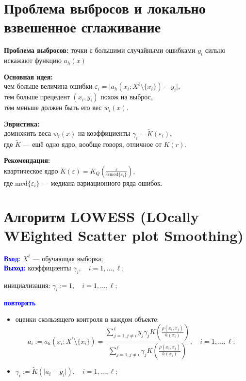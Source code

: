 \section*{Проблема выбросов и локально взвешенное сглаживание}

\textbf{Проблема выбросов:} точки с большими случайными ошибками \(y_i\) сильно искажают функцию \(a_h(x)\)

\vspace{1em}
\textbf{Основная идея:} \\
чем больше величина ошибки \(\varepsilon_i = \lvert a_h(x_i; X^\ell \setminus \{x_i\}) - y_i \rvert\), \\
тем больше прецедент \((x_i, y_i)\) похож на выброс, \\
тем меньше должен быть его вес \(w_i(x)\).

\vspace{1em}
\textbf{Эвристика:} \\
домножить веса \(w_i(x)\) на коэффициенты \(\gamma_i = \tilde{K}(\varepsilon_i)\), \\
где \(\tilde{K}\) — ещё одно ядро, вообще говоря, отличное от \(K(r)\).

\vspace{1em}
\textbf{Рекомендация:} \\
квартическое ядро \(\tilde{K}(\varepsilon) = K_Q \left( \frac{\varepsilon}{6 \, \mathrm{med}\{\varepsilon_i\}} \right)\), \\
где \(\mathrm{med}\{\varepsilon_i\}\) — медиана вариационного ряда ошибок.

\section*{Алгоритм LOWESS (LOcally WEighted Scatter plot Smoothing)}

\vspace{1em}
\textcolor{blue}{\textbf{Вход:}} \(X^\ell\) — обучающая выборка; \\
\textcolor{blue}{\textbf{Выход:}} коэффициенты \(\gamma_i, \quad i = 1, \ldots, \ell\);

\vspace{1em}
инициализация: \(\gamma_i := 1, \quad i = 1, \ldots, \ell\);

\vspace{1em}
\textcolor{blue}{\textbf{повторять}}
\begin{itemize}
    \item оценки скользящего контроля в каждом объекте:
    \[
    a_i := a_h(x_i; X^\ell \setminus \{x_i\}) = \frac{\sum\limits_{j=1, j \neq i}^{\ell} y_j \gamma_j K\left( \frac{\rho(x_i, x_j)}{h(x_i)} \right)}{\sum\limits_{j=1, j \neq i}^{\ell} \gamma_j K\left( \frac{\rho(x_i, x_j)}{h(x_i)} \right)}, \quad i = 1, \ldots, \ell;
    \]
    \item \(\gamma_i := \tilde{K}(\lvert a_i - y_i \rvert), \quad i = 1, \ldots, \ell;\)
\end{itemize}

